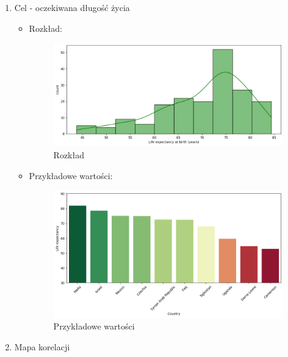 \documentclass{article}
\begin{document}
\begin{enumerate}
    \item Cel - oczekiwana długość życia
    \begin{itemize}
        \item Rozkład: 
        \begin{figure}[H]
                \label{fig:life_expectancy_distribution}
                \includegraphics[width=\textwidth]{graphs/life_expecatancy_buckets.png}
                \caption{Rozkład}
                \centering
        \end{figure}
        \item Przykładowe wartości:
        \begin{figure}[H]
                \label{fig:sample_life_expectancy}
                \includegraphics[width=\textwidth]{graphs/life_expectancy_sample.png}
                \caption{Przykładowe wartości}
                \centering
        \end{figure}
    \end{itemize}
    \pagebreak
    \item Mapa korelacji
        \begin{figure}[H]
                \label{fig:correlation_map}

\end{figure}
\end{enumerate}
\end{document}

